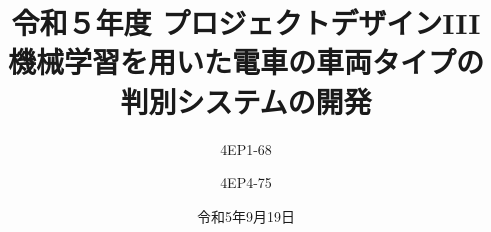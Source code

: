 


\renewcommand{\lstlistingname}{リスト}

\iffalse
\usepackage[hang,bf,labelformat = empty,labelsep=none,figurename=Y, tablename=X, singlelinecheck=off,justification=centering,labelfont=bf,textfont=bf]{caption} 
\else
\usepackage[hang,bf,labelsep=colon,figurename=図, tablename=表, singlelinecheck=off,justification=centering,labelfont=bf,textfont=bf]{caption} 
\fi

% 



% 
%
\cfoot{\thepage/\pageref{LastPage}}

{
  \fancyhf{}
   \renewcommand{\headrulewidth}{0pt} %
}


% 
%

\title{
{\normalsize 令和５年度 プロジェクトデザインIII}\\\vspace{10mm}
{\LARGE 機械学習を用いた電車の車両タイプの\\判別システムの開発}
}
\date{令和5年9月19日}
\author{
4EP1-68\\  \and
4EP4-75\\  
}



